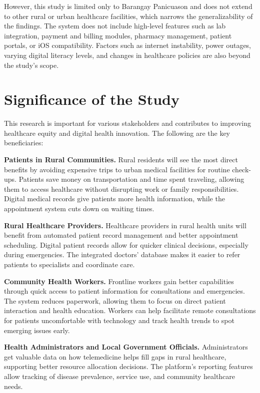 \documentclass[12pt]{report}
\begin{document}
However, this study is limited only to Barangay Panicuason and does not extend
to other rural or urban healthcare facilities, which narrows the generalizability
of the findings. The system does not include high-level features such as lab
integration, payment and billing modules, pharmacy management, patient portals,
or iOS compatibility. Factors such as internet instability, power outages,
varying digital literacy levels, and changes in healthcare policies are also
beyond the study's scope.

\section*{Significance of the Study}

This research is important for various stakeholders and contributes to improving
healthcare equity and digital health innovation. The following are the key
beneficiaries:

\noindent\textbf{Patients in Rural Communities.} Rural residents will see the most direct
benefits by avoiding expensive trips to urban medical facilities for routine
check-ups. Patients save money on transportation and time spent traveling,
allowing them to access healthcare without disrupting work or family
responsibilities. Digital medical records give patients more health information,
while the appointment system cuts down on waiting times.

\noindent\textbf{Rural Healthcare Providers.} Healthcare providers in rural health units
will benefit from automated patient record management and better appointment
scheduling. Digital patient records allow for quicker clinical decisions,
especially during emergencies. The integrated doctors' database makes it easier
to refer patients to specialists and coordinate care.

\noindent\textbf{Community Health Workers.} Frontline workers gain better capabilities
through quick access to patient information for consultations and emergencies.
The system reduces paperwork, allowing them to focus on direct patient
interaction and health education. Workers can help facilitate remote
consultations for patients uncomfortable with technology and track health trends
to spot emerging issues early.

\noindent\textbf{Health Administrators and Local Government Officials.} Administrators
get valuable data on how telemedicine helps fill gaps in rural healthcare,
supporting better resource allocation decisions. The platform's reporting
features allow tracking of disease prevalence, service use, and community
healthcare needs.
\end{document}
